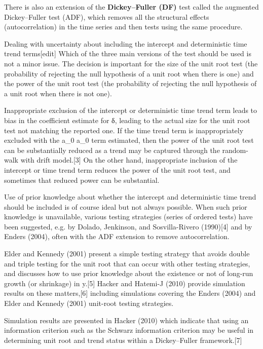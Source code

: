 There is also an extension of the \textbf{Dickey–Fuller (DF)} test called the augmented Dickey–Fuller test (ADF), which removes all the structural effects (autocorrelation) in the time series and then tests using the same procedure.

Dealing with uncertainty about including the intercept and deterministic time trend terms[edit]
Which of the three main versions of the test should be used is not a minor issue. The decision is important for the size of the unit root test (the probability of rejecting the null hypothesis of a unit root when there is one) and the power of the unit root test (the probability of rejecting the null hypothesis of a unit root when there is not one). 

Inappropriate exclusion of the intercept or deterministic time trend term leads to bias in the coefficient estimate for δ, leading to the actual size for the unit root test not matching the reported one. If the time trend term is inappropriately excluded with the {\displaystyle a_{0}} a_0  term estimated, then the power of the unit root test can be substantially reduced as a trend may be captured through the random-walk with drift model.[3] On the other hand, inappropriate inclusion of the intercept or time trend term reduces the power of the unit root test, and sometimes that reduced power can be substantial.

Use of prior knowledge about whether the intercept and deterministic time trend should be included is of course ideal but not always possible. When such prior knowledge is unavailable, various testing strategies (series of ordered tests) have been suggested, e.g. by Dolado, Jenkinson, and Sosvilla-Rivero (1990)[4] and by Enders (2004), often with the ADF extension to remove autocorrelation. 

Elder and Kennedy (2001) present a simple testing strategy that avoids double and triple testing for the unit root that can occur with other testing strategies, and discusses how to use prior knowledge about the existence or not of long-run growth (or shrinkage) in y.[5] Hacker and Hatemi-J (2010) provide simulation results on these matters,[6] including simulations covering the Enders (2004) and Elder and Kennedy (2001) unit-root testing strategies. 


Simulation results are presented in Hacker (2010) which indicate that using an information criterion such as the Schwarz information criterion may be useful in determining unit root and trend status within a Dickey–Fuller framework.[7]


